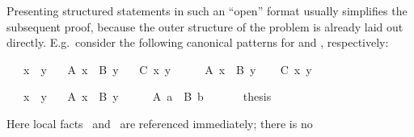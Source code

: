 \begin{isabellebody}
\begin{isamarkuptext}
  Presenting structured statements in such an ``open'' format usually
  simplifies the subsequent proof, because the outer structure of the
  problem is already laid out directly.  E.g.\ consider the following
  canonical patterns for \isa{{\isachardoublequote}{\isasymSHOWS}{\isachardoublequote}} and \isa{{\isachardoublequote}{\isasymOBTAINS}{\isachardoublequote}},
  respectively:%
\end{isamarkuptext}%
\isamarkuptrue%
%
\begin{minipage}{0.5\textwidth}
\isamarkupfalse%
\isanewline
\ \ \ x\ \ y\isanewline
\ \ \ {\isachardoublequoteopen}A\ x{\isachardoublequoteclose}\ \ {\isachardoublequoteopen}B\ y{\isachardoublequoteclose}\isanewline
\ \ \ {\isachardoublequoteopen}C\ x\ y{\isachardoublequoteclose}\isanewline
%
\isadelimproof
%
\endisadelimproof
%
\isatagproof
{}\isamarkupfalse%
\ {\isacharminus}\isanewline
\ \ \isamarkupfalse%
\ {\isacharbackquoteopen}A\ x{\isacharbackquoteclose}\ \ {\isacharbackquoteopen}B\ y{\isacharbackquoteclose}\isanewline
\ \ \isamarkupfalse%
\ {\isachardoublequoteopen}C\ x\ y{\isachardoublequoteclose}\ \isamarkupfalse%
\isanewline
{}\isamarkupfalse%
%
\endisatagproof
{\isafoldproof}%
%
\isadelimproof
%
\endisadelimproof
%
\end{minipage}\begin{minipage}{0.5\textwidth}
\isamarkupfalse%
\isanewline
\ \ \ x\ \ y\isanewline
\ \ \ {\isachardoublequoteopen}A\ x{\isachardoublequoteclose}\ \ {\isachardoublequoteopen}B\ y{\isachardoublequoteclose}\isanewline
%
\isadelimproof
%
\endisadelimproof
%
\isatagproof
{}\isamarkupfalse%
\ {\isacharminus}\isanewline
\ \ \isamarkupfalse%
\ {\isachardoublequoteopen}A\ a{\isachardoublequoteclose}\ \ {\isachardoublequoteopen}B\ b{\isachardoublequoteclose}\ \isamarkupfalse%
\isanewline
\ \ \isamarkupfalse%
\ \isamarkupfalse%
\ thesis\ \isacommand{{\isachardot}{\isachardot}}\isamarkupfalse%
\isanewline
{}\isamarkupfalse%
%
\endisatagproof
{\isafoldproof}%
%
\isadelimproof
%
\endisadelimproof
%
\end{minipage}
%
\begin{isamarkuptext}%
\medskip\noindent Here local facts \isacharbackquoteopen{}\isacharbackquoteclose\ and \isacharbackquoteopen{}\isacharbackquoteclose\ are referenced immediately; there is no

\end{isamarkuptext}
\end{isabellebody}
